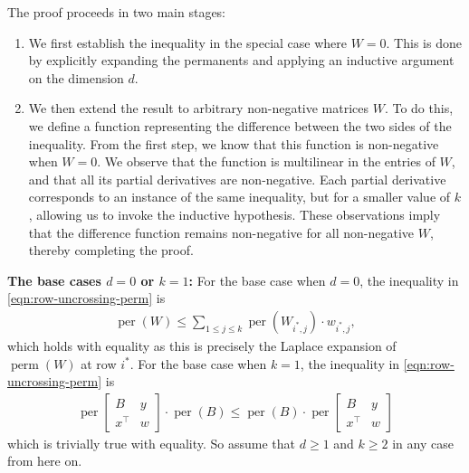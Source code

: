 \documentclass[11pt]{article}
\makeatletter
\theoremstyle{definition}
\newenvironment{proof}[1][\protect\proofname]{\par
	\normalfont\topsep6\p@\@plus6\p@\relax
	\trivlist
	\itemindent\parindent        %
	\item[\hskip\labelsep\scshape #1]\ignorespaces
}{%
	\endtrivlist\@endpefalse
}
\providecommand{\proofname}{Proof}
\DeclareMathOperator{\per}{per}
\DeclareMathOperator{\perm}{perm}
\newcommand{\sumL}{\sum\limits}
\makeatother
\begin{document}
\begin{proof}
The proof proceeds in two main stages:
\begin{enumerate}
	\item We first establish the inequality in the special case where \( W = 0 \). This is done by explicitly expanding the permanents and applying an inductive argument on the dimension \( d \).
	
	\item We then extend the result to arbitrary non-negative matrices \( W \). To do this, we define a function representing the difference between the two sides of the inequality. From the first step, we know that this function is non-negative when \( W = 0 \). We observe that the function is multilinear in the entries of \( W \), and that all its partial derivatives are non-negative. Each partial derivative corresponds to an instance of the same inequality, but for a smaller value of \( k \), allowing us to invoke the inductive hypothesis. These observations imply that the difference function remains non-negative for all non-negative \( W \), thereby completing the proof.
\end{enumerate}
\textbf{The base cases $d=0$ or $k=1$:} For the base case when $d=0$, the inequality in \eqref{eqn:row-uncrossing-perm} is 
\begin{align*}
	\per(W)\leq \sumL_{1\leq j\leq k}\per(W_{i^*,j})\cdot w_{i^*,j} ,
\end{align*}
which holds with equality as this is precisely the Laplace expansion of $\perm(W)$ at row $i^*$. For the base case when $k=1$, the inequality in \eqref{eqn:row-uncrossing-perm} is 
\begin{align*}
	\per\begin{bmatrix}
		B & y \\
		x^{\top} & w
	\end{bmatrix}\cdot \per(B) \leq  
	\per(B)\cdot \per\begin{bmatrix}
		B & y \\
		x^{\top} & w
	\end{bmatrix} 
\end{align*}
which is trivially true with equality.  So assume that $d\geq 1$ and $k\geq 2$ in any case from here on. 


\end{proof}
\end{document}
